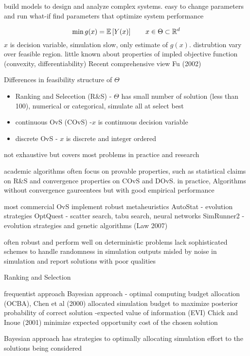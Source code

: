 build models to design and analyze complex systems.
easy to change parameters and run what-if
find parameters that optimize system performance

\begin{equation}
\min g(x) = \Expect \left[ Y(x) \right] 	\hspace{20px} x \in \Theta \subset \R{d}
\end{equation}
$x$ is decision variable, simulation slow, only estimate of $g(x)$.  distrubtion vary over feasible region.  little known about properties of impled objective function (convexity, differentiability)
Recent comprehensive view Fu (2002)

Differences in feasibility structure of $\Theta$
\begin{itemize}
\item Ranking and Selecetion (R\&S) - $\Theta$ has small number of solution (less than 100), numerical or categorical, simulate all at select best
\item continuous OvS (COvS) -$x$ is continuous decision variable
\item discrete OvS - $x$ is discrete and integer ordered
\end{itemize}
not exhaustive but covers most problems in practice and research

academic algorithms often focus on provable properties, such as statistical claims on R\&S and convergence properties on COvS and DOvS.  in practice, Algorithms without convergence gaureentees but with good empirical performance

most commercial OvS implement robust metaheuristics
AutoStat - evolution strategies
OptQuest - scatter search, tabu search, neural networks
SimRunner2 - evolution strategies and genetic algorithms (Law 2007)

often robust and perform well on deterministic problems
lack sophisticated schemes to handle randomness in simulation outputs
misled by noise in simulation and report solutions with poor qualities


Ranking and Selection 

frequentist approach
Bayesian approach - optimal computing budget allocation (OCBA), Chen et al (2000) allocated simulation budget to maximize posterior probability of correct solution
	-expected value of information (EVI) Chick and Inoue (2001) minimize expected opportunity cost of the chosen solution

Bayesian approach has strategies to optimally allocating simulation effort to the solutions being considered

